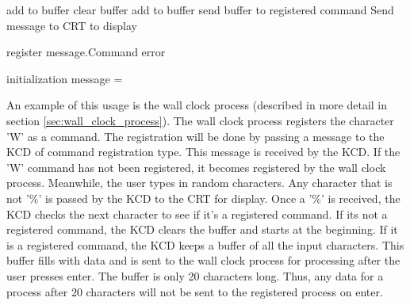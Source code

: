 \documentclass[12pt]{report}
\begin{document}
\begin{algorithmic}
                \State add to buffer
            \Else
                \State clear buffer
            \EndIf
            \State add to buffer
            \State send buffer to registered command
        \EndIf
        \State Send message to CRT to display

    \EndFunction

    \bigskip

            \State register message.Command
        \Else
            \State error
        \EndIf
    \EndFunction

    \bigskip

        \State initialization
            \State message = 
                \State {}
                \State {}
            \EndIf
        \EndWhile
    \EndFunction
\end{algorithmic}

An example of this usage is the wall clock process (described in more detail in section \ref{sec:wall_clock_process}). The wall clock process registers the character 'W' as a command. The registration will be done by passing a message to the KCD of command registration type. This message is received by the KCD. If the 'W' command has not been registered, it becomes registered by the wall clock process. Meanwhile, the user types in random characters. Any character that is not '\%' is passed by the KCD to the CRT for display. Once a '\%' is received, the KCD checks the next character to see if it's a registered command. If its not a registered command, the KCD clears the buffer and starts at the beginning. If it is a registered command, the KCD keeps a buffer of all the input characters. This buffer fills with data and is sent to the wall clock process for processing after the user presses enter. The buffer is only 20 characters long. Thus, any data for a process after 20 characters will not be sent to the registered process on enter.
\end{document}
